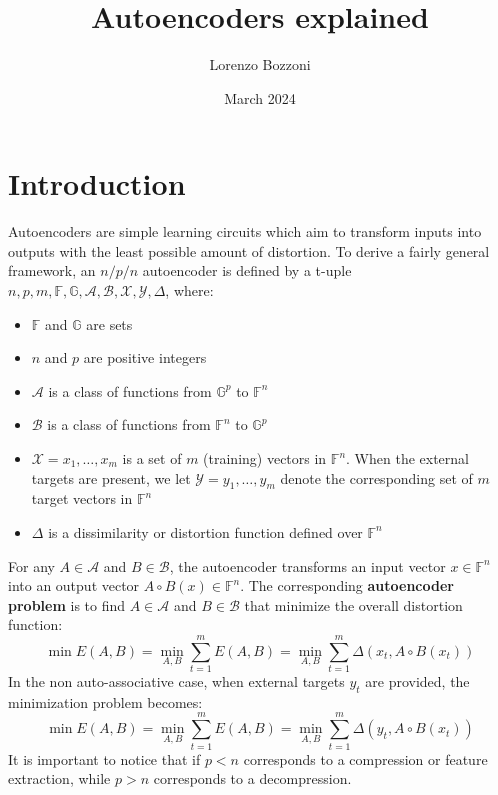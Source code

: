 \documentclass{article}
\title{Autoencoders explained}
\author{Lorenzo Bozzoni}
\date{March 2024}
\begin{document}
\maketitle
\tableofcontents

\section{Introduction}
Autoencoders are simple learning circuits which aim to transform inputs into outputs with
the least possible amount of distortion. To derive a fairly general framework, an $n/p/n$  autoencoder is defined by a t-uple $n,p,m,\mathbb{F},\mathbb{G},\mathcal{A},\mathcal{B},\mathcal{X},\mathcal{Y}, \Delta$, where:
\begin{itemize}
    \item $\mathbb{F}$ and $\mathbb{G}$ are sets
    \item $n$ and $p$ are positive integers
    \item $\mathcal{A}$ is a class of functions from $\mathbb{G}^p$ to $\mathbb{F}^n$
    \item $\mathcal{B}$ is a class of functions from $\mathbb{F}^n$ to $\mathbb{G}^p$
    \item $\mathcal{X} = {x_1, \dots, x_m}$ is a set of $m$ (training) vectors in $\mathbb{F}^n$. When the external targets are present, we let $\mathcal{Y} = {y_1, \dots, y_m}$ denote the corresponding set of $m$ target vectors in $\mathbb{F}^n$ 
    \item $\Delta$ is a dissimilarity or distortion function defined over $\mathbb{F}^n$
\end{itemize}
For any $A \in \mathcal{A}$ and $B \in \mathcal{B}$, the autoencoder transforms an input vector $x \in \mathbb{F}^n$ into an output vector $A \circ B(x) \in \mathbb{F}^n$. The corresponding \textbf{autoencoder problem} is to find $A \in \mathcal{A}$ and $B \in \mathcal{B}$ that minimize the overall distortion function:
\begin{equation}
    \min E(A,B) = \min_{A ,B} \sum_{t=1}^m E(A,B)=\min_{A ,B} \sum_{t=1}^m \Delta(x_t, A \circ B(x_t))
\end{equation}
In the non auto-associative case, when external targets $y_t$ are provided, the minimization
problem becomes:
\begin{equation}
    \min E(A,B) = \min_{A ,B} \sum_{t=1}^m E(A,B)=\min_{A ,B} \sum_{t=1}^m \Delta(y_t, A \circ B(x_t))
\end{equation}
It is important to notice that if $p < n$ corresponds to a compression or feature extraction, while $p > n$ corresponds to a decompression. 




\end{document}
